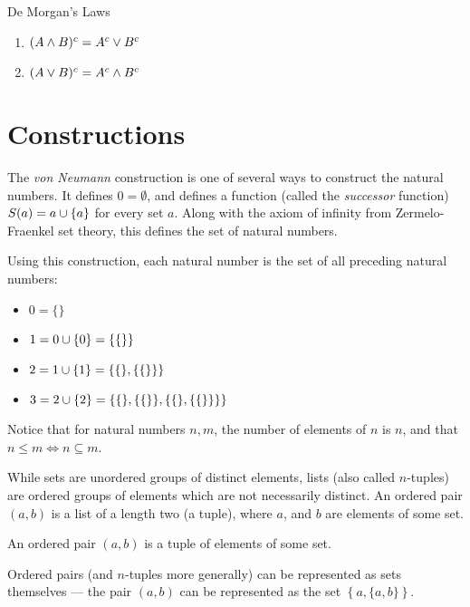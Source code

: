 \begin{thm}{De Morgan's Laws}\label{demorgan-set}\proofbreak
    \begin{enumerate}
        \item $(A \land B)^{c} = A^{c} \lor B^{c}$
        \item $(A \lor B)^{c} = A^{c} \land B^{c}$
    \end{enumerate}
\end{thm}

\section{Constructions}

The \emph{von Neumann} construction is one of several ways to construct the natural numbers. It defines $0 = \emptyset$, and defines a function (called the \emph{successor} function) $S(a) = a \cup \{a\}$ for every set $a$. Along with the axiom of infinity from Zermelo-Fraenkel set theory, this defines the set of natural numbers.

Using this construction, each natural number is the set of all preceding natural numbers:
\begin{itemize}
    \item $0 = \{\}$
    \item $1 = 0 \cup \{0\} = \{\{\}\}$
    \item $2 = 1 \cup \{1\} = \{\{\}, \{\{\}\}\}$
    \item $3 = 2 \cup \{2\} = \{\{\}, \{\{\}\}, \{\{\}, \{\{\}\}\}\}$
\end{itemize}

Notice that for natural numbers $n, m$, the number of elements of $n$ is $n$, and that $n \leq m \iff n \subseteq m$.

While sets are unordered groups of distinct elements, lists (also called $n$-tuples) are ordered groups of elements which are not necessarily distinct. An ordered pair $(a, b)$ is a list of a length two (a tuple), where $a$, and $b$ are elements of some set.

\begin{defn}\label{tuple}
    An ordered pair $(a, b)$ is a tuple of elements of some set.
\end{defn}

Ordered pairs (and $n$-tuples more generally) can be represented as sets themselves --- the pair $(a, b)$ can be represented as the set $\left\{a, \{a, b\}\right\}$.

